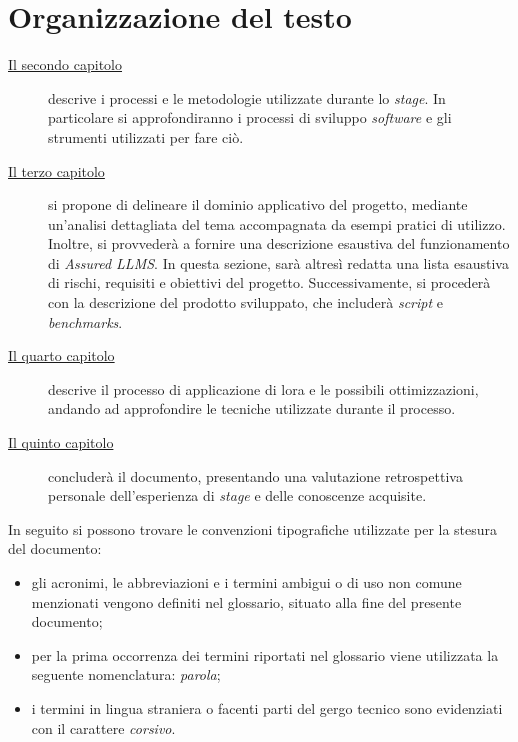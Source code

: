 \section{Organizzazione del testo}
\begin{description}
    \item[{\hyperref[chap:processi-metodologie]{Il secondo capitolo}}] descrive i processi e le metodologie utilizzate durante lo \textit{stage}. In particolare si approfondiranno i processi di sviluppo \textit{software} e gli strumenti utilizzati per fare ciò.
    
    \item[{\hyperref[chap:descrizione-stage-1]{Il terzo capitolo}}] si propone di delineare il dominio applicativo del progetto, mediante un'analisi dettagliata del tema accompagnata da esempi pratici di utilizzo. 
    Inoltre, si provvederà a fornire una descrizione esaustiva del funzionamento di \textit{Assured LLMS}. 
    In questa sezione, sarà altresì redatta una lista esaustiva di rischi, requisiti e obiettivi del progetto. 
    Successivamente, si procederà con la descrizione del prodotto sviluppato, che includerà \textit{script} e \textit{benchmarks}. 

    \item[{\hyperref[chap:descrizione-stage-2]{Il quarto capitolo}}] descrive il processo di applicazione di \gls{lora} e le possibili ottimizzazioni, andando ad approfondire le tecniche utilizzate durante il processo.

    \item[{\hyperref[chap:conclusioni]{Il quinto capitolo}}] concluderà il documento, presentando una valutazione retrospettiva personale dell'esperienza di \textit{stage} e delle conoscenze acquisite.
    
\end{description}

In seguito si possono trovare le convenzioni tipografiche utilizzate per la stesura del documento:
\begin{itemize}
	\item gli acronimi, le abbreviazioni e i termini ambigui o di uso non comune menzionati vengono definiti nel glossario, situato alla fine del presente documento;
	\item per la prima occorrenza dei termini riportati nel glossario viene utilizzata la seguente nomenclatura: \textit{parola}\glox\gloxspacing;
	\item i termini in lingua straniera o facenti parti del gergo tecnico sono evidenziati con il carattere \textit{corsivo}.
\end{itemize}

\newpage